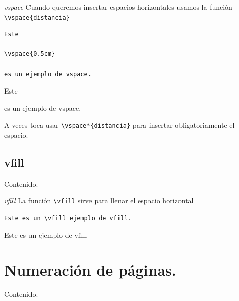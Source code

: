 \documentclass[dvipsnames,xcolor, handout]{beamer}
\theoremstyle{plain}
\theoremstyle{definition}
\begin{document}
\begin{frame}[fragile]{\itshape vspace}
    Cuando queremos insertar espacios horizontales usamos la función \verb!\vspace{distancia}!
\begin{multicols*}{2}
\begin{verbatim}
Este 

\vspace{0.5cm}

es un ejemplo de vspace.
\end{verbatim}
\columnbreak
Este 

\vspace{0.5cm} 

es un ejemplo de vspace.
\end{multicols*}


A veces toca usar \verb!\vspace*{distancia}! para insertar obligatoriamente el espacio.

\end{frame}

\subsection{vfill}
\begin{frame}{Contenido.}
 \begin{footnotesize}
\vspace*{-1cm}
\begin{multicols}{2}
  \tableofcontents[currentsubsection]
\end{multicols}
\end{footnotesize}
\end{frame}

\begin{frame}[fragile]{\itshape vfill}
La función \verb!\vfill! sirve para llenar el espacio horizontal
    

\begin{verbatim}
Este es un \vfill ejemplo de vfill.    
\end{verbatim}

Este es un \vfill  ejemplo de vfill.        

\end{frame}

\section{Numeración de páginas.}
\begin{frame}{Contenido.}
  \begin{footnotesize}
\vspace*{-1cm}
\begin{multicols}{2}
  \tableofcontents[currentsection]
\end{multicols}
\end{footnotesize}
\end{frame}
\end{document}
